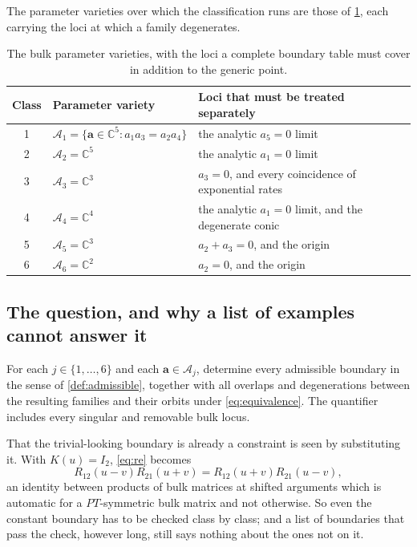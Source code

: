 \documentclass[11pt,reqno]{amsart}
\theoremstyle{plain}
\theoremstyle{definition}
\theoremstyle{remark}
\numberwithin{equation}{section}
\newcommand{\C}{\mathbb C}
\newcommand{\Id}{I_2}
\begin{document}
The parameter varieties over which the classification runs are those of
\cref{tab:parameter-varieties}, each carrying the loci at which a family
degenerates.

\begin{table}[t]
\centering
\caption{The bulk parameter varieties, with the loci a complete boundary table
must cover in addition to the generic point.}
\label{tab:parameter-varieties}
\begin{tabularx}{\textwidth}{c X X}
\toprule
Class & Parameter variety & Loci that must be treated separately \\
\midrule
1 & $\mathcal A_1=\{\mathbf a\in\C^5:a_1a_3=a_2a_4\}$ & the analytic $a_5=0$ limit \\
2 & $\mathcal A_2=\C^5$ & the analytic $a_1=0$ limit \\
3 & $\mathcal A_3=\C^3$ & $a_3=0$, and every coincidence of exponential rates \\
4 & $\mathcal A_4=\C^4$ & the analytic $a_1=0$ limit, and the degenerate conic \\
5 & $\mathcal A_5=\C^3$ & $a_2+a_3=0$, and the origin \\
6 & $\mathcal A_6=\C^2$ & $a_2=0$, and the origin \\
\bottomrule
\end{tabularx}
\end{table}

\subsection{The question, and why a list of examples cannot answer it}

For each $j\in\{1,\dots,6\}$ and each $\mathbf a\in\mathcal A_j$, determine every
admissible boundary in the sense of \cref{def:admissible}, together with all
overlaps and degenerations between the resulting families and their orbits under
\cref{eq:equivalence}. The quantifier includes every singular and removable bulk
locus.

That the trivial-looking boundary is already a constraint is seen by substituting
it. With $K(u)=\Id$, \cref{eq:re} becomes
\begin{equation}
R_{12}(u-v)R_{21}(u+v)=R_{12}(u+v)R_{21}(u-v),
\label{eq:scalar-condition}
\end{equation}
an identity between products of bulk matrices at shifted arguments which is
automatic for a $PT$-symmetric bulk matrix and not otherwise. So even the
constant boundary has to be checked class by class; and a list of boundaries that
pass the check, however long, still says nothing about the ones not on it.
\end{document}
